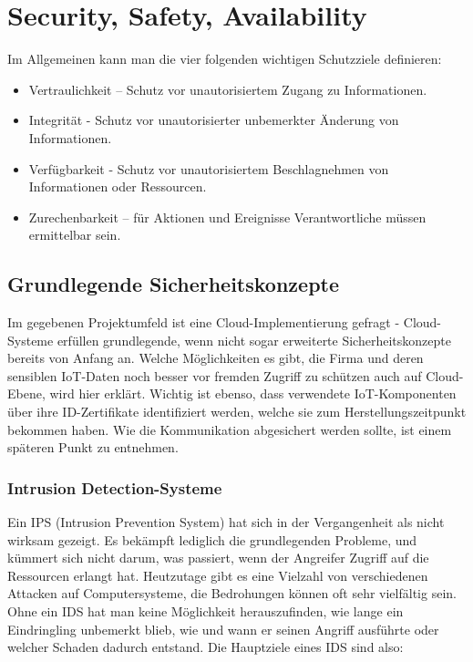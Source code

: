 \documentclass[letterpaper, 12pt]{article}
\let\tempsection\section
\renewcommand\section[1]{\vspace{-0.3cm}\tempsection{#1}\vspace{-0.3cm}}
\let\tempsubsection\subsection
\renewcommand\subsection[1]{\vspace{0cm}\tempsubsection{#1}\vspace{0cm}}
\let\tempsubsubsection\subsubsection
\renewcommand\subsubsection[1]{\vspace{0cm}\tempsubsubsection{#1}\vspace{0cm}}
\begin{document}
\section{Security, Safety, Availability}

Im Allgemeinen kann man die vier folgenden wichtigen Schutzziele definieren:

\begin{itemize}
	\item Vertraulichkeit – Schutz vor unautorisiertem Zugang zu Informationen.
	\item Integrität - Schutz vor unautorisierter unbemerkter Änderung von Informationen.
	\item Verfügbarkeit - Schutz vor unautorisiertem Beschlagnehmen von Informationen
oder Ressourcen.
	\item Zurechenbarkeit – für Aktionen und Ereignisse Verantwortliche müssen ermittelbar
sein. \cite{ausarbeitungsec}
\end{itemize}

\subsection{Grundlegende Sicherheitskonzepte}

Im gegebenen Projektumfeld ist eine Cloud-Implementierung gefragt - Cloud-Systeme erfüllen grundlegende, wenn nicht sogar erweiterte Sicherheitskonzepte bereits von Anfang an. Welche Möglichkeiten es gibt, die Firma und deren sensiblen IoT-Daten noch besser vor fremden Zugriff zu schützen auch auf Cloud-Ebene, wird hier erklärt. Wichtig ist ebenso, dass verwendete IoT-Komponenten über ihre ID-Zertifikate identifiziert werden, welche sie zum Herstellungszeitpunkt bekommen haben. Wie die Kommunikation abgesichert werden sollte, ist einem späteren Punkt zu entnehmen. \cite{iotsec}

\subsubsection{Intrusion Detection-Systeme}

Ein IPS (Intrusion Prevention System) hat sich in der Vergangenheit als nicht wirksam gezeigt. Es bekämpft lediglich die grundlegenden Probleme, und kümmert sich nicht darum, was passiert, wenn der Angreifer Zugriff auf die Ressourcen erlangt hat. Heutzutage gibt es eine Vielzahl von verschiedenen Attacken auf Computersysteme, die Bedrohungen können oft sehr vielfältig sein. Ohne ein IDS hat man keine Möglichkeit herauszufinden,
wie lange ein Eindringling unbemerkt blieb, wie und wann er seinen Angriff
ausführte oder welcher Schaden dadurch entstand. Die Hauptziele eines IDS sind also:
\end{document}
